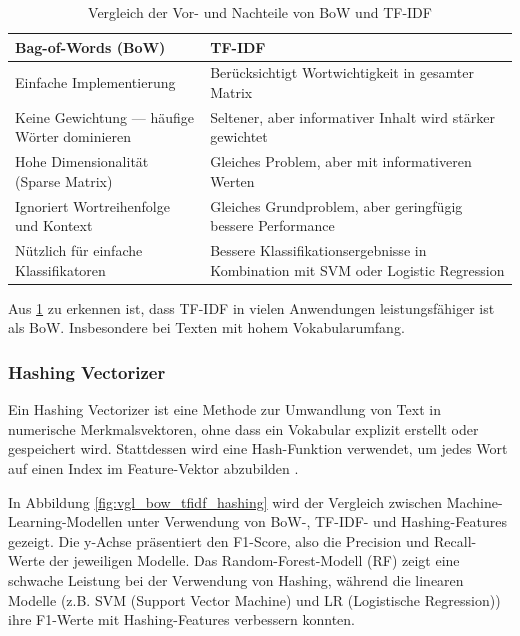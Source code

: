 \begin{table}[!ht]
    \centering
        \begin{tabular}{|p{6cm}|p{6cm}|}
            \hline
            \textbf{Bag-of-Words (BoW)} & \textbf{TF-IDF} \\
            \hline
            Einfache Implementierung \cite{cichosz2018forum} & Berücksichtigt Wortwichtigkeit in gesamter Matrix  \cite{elov2023uzbek} \\
            \hline
            Keine Gewichtung — häufige Wörter dominieren & Seltener, aber informativer Inhalt wird stärker gewichtet \cite{das2023tfidf} \\
            \hline
            Hohe Dimensionalität (Sparse Matrix) & Gleiches Problem, aber mit informativeren Werten \cite{alzami2020tfidf} \\
            \hline
            Ignoriert Wortreihenfolge und Kontext \cite{umar2022sentiment} & Gleiches Grundproblem, aber geringfügig bessere Performance \cite{parmar2024stacking} \\
            \hline
            Nützlich für einfache Klassifikatoren & Bessere Klassifikationsergebnisse in Kombination mit SVM oder Logistic Regression \cite{iyer2024sentiment} \\
            \hline
        \end{tabular}
    \caption{Vergleich der Vor- und Nachteile von BoW und TF-IDF}
    \label{tab:vergleich}
\end{table}

Aus \ref{tab:vergleich} zu erkennen ist, dass TF-IDF in vielen Anwendungen leistungsfähiger ist als BoW. Insbesondere bei Texten mit hohem Vokabularumfang.

\subsubsection{Hashing Vectorizer}

Ein Hashing Vectorizer ist eine Methode zur Umwandlung von Text in numerische Merkmalsvektoren, ohne dass ein Vokabular explizit 
erstellt oder gespeichert wird. Stattdessen wird eine Hash-Funktion verwendet, um jedes Wort auf einen Index im Feature-Vektor abzubilden \cite{Buddhadev2025}.

In Abbildung \ref{fig:vgl_bow_tfidf_hashing} wird der Vergleich zwischen Machine-Learning-Modellen unter Verwendung von BoW-, TF-IDF- und
Hashing-Features gezeigt. Die y-Achse präsentiert den F1-Score, also die Precision und Recall-Werte der jeweiligen Modelle.
Das Random-Forest-Modell (RF) zeigt eine schwache Leistung bei der Verwendung von Hashing, während die linearen Modelle 
(z.B. SVM (Support Vector Machine) und LR (Logistische Regression)) ihre F1-Werte mit Hashing-Features verbessern konnten. 

